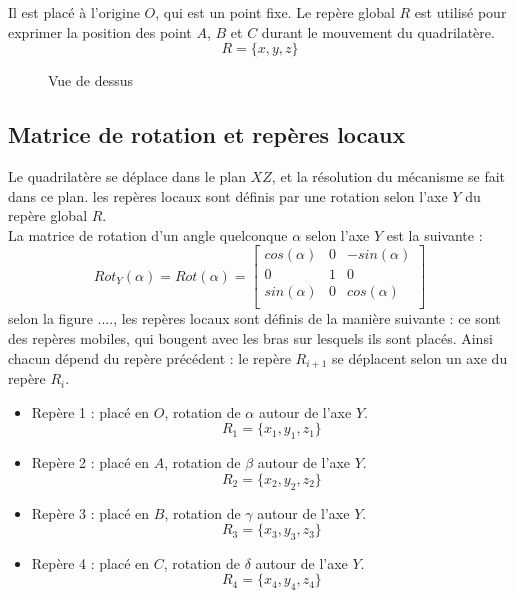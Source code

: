 \documentclass[12pt,a4paper]{article}
\begin{document}
Il est placé à l'origine $O$, qui est un point fixe. Le repère global $R$ est utilisé pour exprimer la position des point $A$, $B$ et $C$ durant le mouvement du quadrilatère.
\begin{equation}
R=\{x,y,z\}
\end{equation}
\medbreak
\medbreak

\begin{figure}[H]
	\centering
	\caption{Vue de dessus}
\end{figure}

\subsection{Matrice de rotation et repères locaux}

Le quadrilatère se déplace dans le plan $XZ$, et la résolution du mécanisme se fait dans ce plan. les repères locaux sont définis par une rotation selon l'axe $Y$ du repère global $R$.\\

La matrice de rotation d'un angle quelconque $\alpha$ selon l'axe $Y$ est la suivante : 
\begin{equation}
Rot_Y(\alpha)=Rot(\alpha)=
\begin{bmatrix}
cos(\alpha) & 0 &-sin(\alpha)\\
0 & 1 & 0 \\
sin(\alpha) & 0 & cos(\alpha) \\
\end{bmatrix}
\end{equation}
selon la figure ...., les repères locaux sont définis de la manière suivante : 
ce sont des repères mobiles, qui bougent avec les bras sur lesquels ils sont placés. Ainsi chacun dépend du repère précédent : le repère $R_{i+1}$ se déplacent selon un axe du repère $R_i$.
\medbreak

\begin{itemize}
	\item Repère 1 : placé en $O$, rotation de $\alpha$ autour de l'axe $Y$.
\begin{equation}
R_1=\{x_1,y_1,z_1\}
\end{equation}
	\item Repère 2 : placé en $A$, rotation de $\beta$ autour de l'axe $Y$.
\begin{equation}
R_2=\{x_2,y_2,z_2\}
\end{equation}
	\item Repère 3 : placé en $B$, rotation de $\gamma$ autour de l'axe $Y$.
\begin{equation}
R_3=\{x_3,y_3,z_3\}
\end{equation}
	\item Repère 4 : placé en $C$, rotation de $\delta$ autour de l'axe $Y$.
\begin{equation}
R_4=\{x_4,y_4,z_4\}
\end{equation}
\end{itemize}
\end{document}
